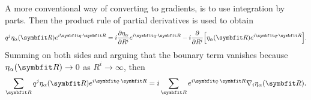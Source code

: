 A more conventional way of converting to gradients, is to use integration by parts. Then the product rule of partial derivatives is used to obtain
\begin{equation}
    \label{eq:Field:Grad:productRuleDerivative}
    q^j\eta_\alpha(\v{R})e^{i\v{q}\cdot\v{R}} = i\frac{\partial\eta_\alpha}{\partial R^i}e^{i\v{q}\cdot\v{R}} - i\frac{\partial}{\partial R^i}\Big[\eta_\alpha(\v{R})e^{i\v{q}\cdot\v{R}}\Big].
\end{equation}
Summing on both sides and arguing that the bounary term vanishes because $\eta_\alpha(\v{R})\to0$ as $R^i\to\infty$, then
\begin{equation}
    \label{eq:Field:Grad:partialIntegraion}
    \sum_\v{R}q^j\eta_\alpha(\v{R})e^{i\v{q}\cdot\v{R}} = i\sum_\v{R}e^{i\v{q}\cdot\v{R}}\nabla_i\eta_\alpha(\v{R}).
\end{equation}

